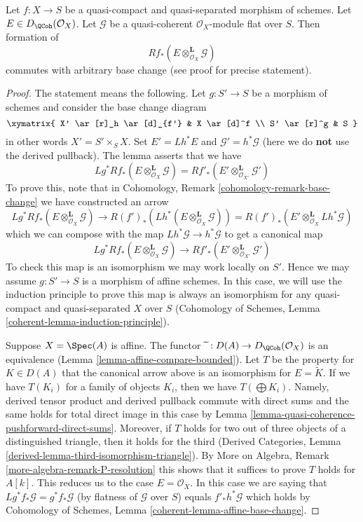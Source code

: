\begin{lemma}
\label{lemma-base-change-tensor}
Let $f : X \to S$ be a quasi-compact and quasi-separated morphism of
schemes. Let $E \in D_\QCoh(\mathcal{O}_X)$. Let $\mathcal{G}$
be a quasi-coherent $\mathcal{O}_X$-module flat over $S$.
Then formation of
$$
Rf_*(E \otimes^\mathbf{L}_{\mathcal{O}_X} \mathcal{G})
$$
commutes with arbitrary base change (see proof for precise statement).
\end{lemma}

\begin{proof}
The statement means the following. Let $g : S' \to S$ be a morphism of
schemes and consider the base change diagram
$$
\xymatrix{
X' \ar[r]_h \ar[d]_{f'} &
X \ar[d]^f \\
S' \ar[r]^g &
S
}
$$
in other words $X' = S' \times_S X$. Set $E' = Lh^*E$ and
$\mathcal{G}' = h^*\mathcal{G}$ (here we do {\bf not} use the derived
pullback). The lemma asserts that we have
$$
Lg^*Rf_*(E \otimes^\mathbf{L}_{\mathcal{O}_X} \mathcal{G}) =
Rf'_*(E' \otimes^\mathbf{L}_{\mathcal{O}_{X'}} \mathcal{G}')
$$
To prove this, note that in
Cohomology, Remark \ref{cohomology-remark-base-change}
we have constructed an arrow
$$
Lg^*Rf_*(E \otimes^\mathbf{L}_{\mathcal{O}_X} \mathcal{G})
\longrightarrow
R(f')_*(Lh^*(E \otimes^\mathbf{L}_{\mathcal{O}_X} \mathcal{G})) =
R(f')_*(E' \otimes^\mathbf{L}_{\mathcal{O}_X} Lh^*\mathcal{G})
$$
which we can compose with the map $Lh^*\mathcal{G} \to h^*\mathcal{G}$
to get a canonical map
$$
Lg^*Rf_*(E \otimes^\mathbf{L}_{\mathcal{O}_X} \mathcal{G})
\longrightarrow
Rf'_*(E' \otimes^\mathbf{L}_{\mathcal{O}_{X'}} \mathcal{G}')
$$
To check this map is an isomorphism we may work locally on $S'$.
Hence we may assume $g : S' \to S$ is a morphism of affine schemes.
In this case, we will use the induction principle to prove this map
is always an isomorphism for any quasi-compact and quasi-separated $X$
over $S$
(Cohomology of Schemes, Lemma \ref{coherent-lemma-induction-principle}).

\medskip\noindent
Suppose $X = \Spec(A)$ is affine. The functor
$\widetilde{\ } : D(A) \to D_\QCoh(\mathcal{O}_X)$ is an equivalence
(Lemma \ref{lemma-affine-compare-bounded}).
Let $T$ be the property for $K \in D(A)$ that
the canonical arrow above is an isomorphism for $E = \widetilde{K}$.
If we have $T(K_i)$ for a family of objects
$K_i$, then we have $T(\bigoplus K_i)$. Namely, derived tensor product
and derived pullback commute with direct sums and the same holds for
total direct image in this case by
Lemma \ref{lemma-quasi-coherence-pushforward-direct-sums}.
Moreover, if $T$ holds for two out of three
objects of a distinguished triangle, then it holds for the third
(Derived Categories, Lemma \ref{derived-lemma-third-isomorphism-triangle}).
By More on Algebra, Remark \ref{more-algebra-remark-P-resolution}
this shows that it suffices to prove $T$ holds for $A[k]$.
This reduces us to the case $E = \mathcal{O}_X$. In this case
we are saying that $Lg^*f_*\mathcal{G} = g^*f_*\mathcal{G}$
(by flatness of $\mathcal{G}$ over $S$)
equals $f'_*h^*\mathcal{G}$ which holds by
Cohomology of Schemes, Lemma \ref{coherent-lemma-affine-base-change}.


\end{proof}
